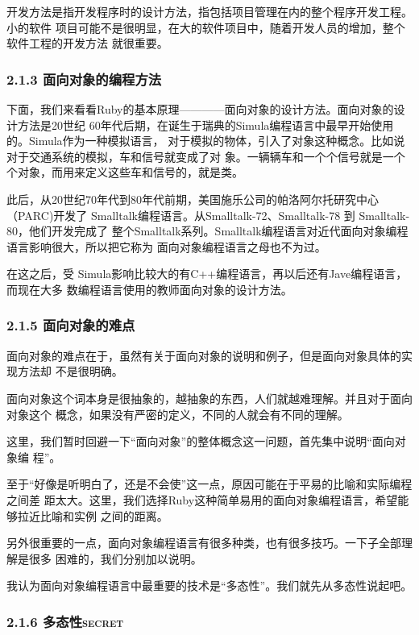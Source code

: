 \documentclass[11pt]{ctexart}
\begin{document}
开发方法是指开发程序时的设计方法，指包括项目管理在内的整个程序开发工程。小的软件
项目可能不是很明显，在大的软件项目中，随着开发人员的增加，整个软件工程的开发方法
就很重要。

\subsubsection{2.1.3 面向对象的编程方法}
\label{sec:orgfa10f82}

下面，我们来看看Ruby的基本原理————面向对象的设计方法。面向对象的设计方法是20世纪
60年代后期，在诞生于瑞典的Simula编程语言中最早开始使用的。Simula作为一种模拟语言，
对于模拟的物体，引入了对象这种概念。比如说对于交通系统的模拟，车和信号就变成了对
象。一辆辆车和一个个信号就是一个个对象，而用来定义这些车和信号的，就是类。

此后，从20世纪70年代到80年代前期，美国施乐公司的帕洛阿尔托研究中心（PARC)开发了
Smalltalk编程语言。从Smalltalk-72、Smalltalk-78 到 Smalltalk-80，他们开发完成了
整个Smalltalk系列。Smalltalk编程语言对近代面向对象编程语言影响很大，所以把它称为
面向对象编程语言之母也不为过。

在这之后，受 Simula影响比较大的有C++编程语言，再以后还有Jave编程语言，而现在大多
数编程语言使用的教师面向对象的设计方法。

\subsubsection{2.1.5 面向对象的难点}
\label{sec:org627b0b6}

面向对象的难点在于，虽然有关于面向对象的说明和例子，但是面向对象具体的实现方法却
不是很明确。

面向对象这个词本身是很抽象的，越抽象的东西，人们就越难理解。并且对于面向对象这个
概念，如果没有严密的定义，不同的人就会有不同的理解。

这里，我们暂时回避一下“面向对象”的整体概念这一问题，首先集中说明“面向对象编
程”。

至于“好像是听明白了，还是不会使”这一点，原因可能在于平易的比喻和实际编程之间差
距太大。这里，我们选择Ruby这种简单易用的面向对象编程语言，希望能够拉近比喻和实例
之间的距离。

另外很重要的一点，面向对象编程语言有很多种类，也有很多技巧。一下子全部理解是很多
困难的，我们分别加以说明。

我认为面向对象编程语言中最重要的技术是“多态性”。我们就先从多态性说起吧。

\subsubsection{2.1.6 多态性\hfill{}\textsc{secret}}
\label{sec:org494974b}
\end{document}
